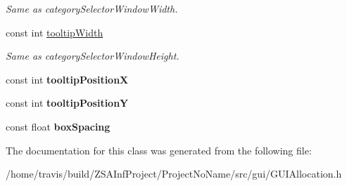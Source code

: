 \begin{DoxyCompactItemize}
\begin{DoxyCompactList}\small\item\em Same as category\-Selector\-Window\-Width. \end{DoxyCompactList}\item 
\hypertarget{classArchitectModeAllocation_a105c9efe42616394d6d74071df0b8fd8}{const int \hyperlink{classArchitectModeAllocation_a105c9efe42616394d6d74071df0b8fd8}{tooltip\-Width}}\label{classArchitectModeAllocation_a105c9efe42616394d6d74071df0b8fd8}

\begin{DoxyCompactList}\small\item\em Same as category\-Selector\-Window\-Height. \end{DoxyCompactList}\item 
\hypertarget{classArchitectModeAllocation_ae1f4fc97ff6f4a95015ffb3b134865da}{const int {\bfseries tooltip\-Position\-X}}\label{classArchitectModeAllocation_ae1f4fc97ff6f4a95015ffb3b134865da}

\item 
\hypertarget{classArchitectModeAllocation_a660d62b2584c075bb2afc3ddd0a8e9be}{const int {\bfseries tooltip\-Position\-Y}}\label{classArchitectModeAllocation_a660d62b2584c075bb2afc3ddd0a8e9be}

\item 
\hypertarget{classArchitectModeAllocation_a0ccae0773a80f11424fdca4f8c0d638a}{const float {\bfseries box\-Spacing}}\label{classArchitectModeAllocation_a0ccae0773a80f11424fdca4f8c0d638a}

\end{DoxyCompactItemize}


The documentation for this class was generated from the following file\-:\begin{DoxyCompactItemize}
\item 
/home/travis/build/\-Z\-S\-A\-Inf\-Project/\-Project\-No\-Name/src/gui/G\-U\-I\-Allocation.\-h\end{DoxyCompactItemize}
